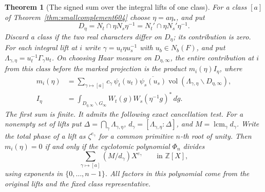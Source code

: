 \documentclass[a4paper,11pt]{article}
\newtheorem{theorem}[proposition]{Theorem}
\theoremstyle{definition}
\theoremstyle{remark}
\newcommand{\ZZ}{\mathbb Z}\newcommand{\ord}{\operatorname{ord}}
\numberwithin{equation}{section}
\begin{document}
\begin{theorem}[The signed sum over the integral lifts of one class]
\leavevmode\label{thm:liftphase604}
For a class \([a]\) of Theorem~\ref{thm:smallcomplement604}
choose \(\eta=a\eta_*\), and put
\[
 D_\eta=N_t\cap\eta N_s\eta^{-1}
        =N_t'\cap\eta N_s'\eta^{-1}.
\]
Discard a class if the two real characters differ on \(D_\eta\);
its contribution is zero. For each integral lift at \(i\) write
\(\gamma=u_t\eta u_s^{-1}\) with \(u_b\in N_b(F)\), and
put \(\Lambda_{\gamma,\eta}=u_t^{-1}\Gamma_\gamma u_t\).
On choosing Haar measure on \(D_{\eta,\infty}\), the entire
contribution at \(i\) from this class before the marked
projection is the product \(m_i(\eta) I_\eta\), where
\[
 \begin{split}
 m_i(\eta)&=\sum_{\gamma\mapsto[a]}
   c_\gamma\,\psi_t(u_t)\overline{\psi_s(u_s)}
     \operatorname{vol}(\Lambda_{\gamma,\eta}\backslash D_{\eta,\infty}),\\
 I_\eta&=\int_{D_{\eta,\infty}\backslash G_\infty}
                   W_t(g)W_s(\eta^{-1}g)^*\,d\dot g .
 \end{split}
\]
The first sum is finite. It admits the following exact
cancellation test. For a nonempty set of lifts put
\(\Delta=\bigcap_\gamma\Lambda_{\gamma,\eta}\),
\(d_\gamma=[\Lambda_{\gamma,\eta}:\Delta]\), and
\(M=\operatorname{lcm}_\gamma d_\gamma\).
Write the total phase of a lift as \(\zeta^{e_\gamma}\)
for a common primitive \(n\)-th root of unity. Then \(m_i(\eta)=0\)
if and only if the cyclotomic polynomial \(\Phi_n\) divides
\[
        \sum_{\gamma\mapsto[a]}(M/d_\gamma)X^{e_\gamma}
                                 \qquad\text{in }\ZZ[X],
\]
using exponents in \(\{0,\ldots,n-1\}\). All factors in
this polynomial come from the original lifts and the fixed
class representative.
\end{theorem}
\end{document}

